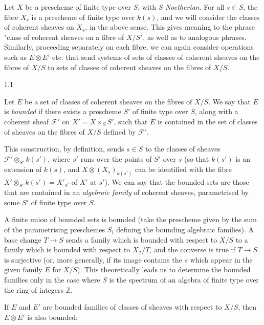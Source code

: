   Let \(X\) be a prescheme of finite type over \(S\), with \(S\) \emph{Noetherian}.
  For all \(s\in  S\), the fibre \(X_s\) is a prescheme of finite type over \(k(s)\), and we will consider the classes of coherent sheaves on \(X_s\), in the above sense.
  This gives meaning to the phrase "class of coherent sheaves on a fibre of \(X/S\)", as well as to analogous phrases.
  Similarly, proceeding separately on each fibre, we can again consider operations such as \(E\otimes  E'\) etc. that send systems of sets of classes of coherent sheaves on the fibres of \(X/S\) to sets of classes of coherent sheaves on the fibres of \(X/S\).\begin{definition}{1.1}\label{fga3.iv-1-definition-1.1}\skipsinglepar\par{}Let \(E\) be a set of classes of coherent sheaves on the fibres of \(X/S\).
    We say that \(E\) is \emph{bounded} if there exists a prescheme \(S'\) of finite type over \(S\), along with a coherent sheaf \(\mathscr {F}'\) on \(X'=X\times _S S'\), such that \(E\) is contained in the set of classes of sheaves on the fibres of \(X/S\) defined by \(\mathscr {F}'\).\end{definition}\par{}This construction, by definition, sends \(s\in  S\) to the classes of sheaves \(\mathscr {F}'\otimes _{S'}k(s')\), where \(s'\) runs over the points of \(S'\) over \(s\) (so that \(k(s')\) is an extension of \(k(s)\), and \(X\otimes  (X_s)_{k(s')}\) can be identified with the fibre \(X'\otimes _{S'}k(s')=X'_{s'}\) of \(X'\) at \(s'\)).
  We can say that the bounded sets are those that are contained in an \emph{algebraic family} of coherent sheaves, parametrised by some \(S'\) of finite type over \(S\).\par{}A finite union of bounded sets is bounded (take the prescheme given by the sum of the parametrising preschemes \(S_i\) defining the bounding algebraic families).
  A base change \(T\to  S\) sends a family which is bounded with respect to \(X/S\) to a family which is bounded with respect to \(X_T/T\), and the converse is true if \(T\to  S\) is surjective (or, more generally, if its image contains the \(s\) which appear in the given family \(E\) for \(X/S\)).
  This theoretically leads us to determine the bounded families only in the case where \(S\) is the spectrum of an algebra of finite type over the ring of integers \(\mathbb {Z}\).\par{}If \(E\) and \(E'\) are bounded families of classes of sheaves with respect to \(X/S\), then \(E\otimes  E'\) is also bounded:
